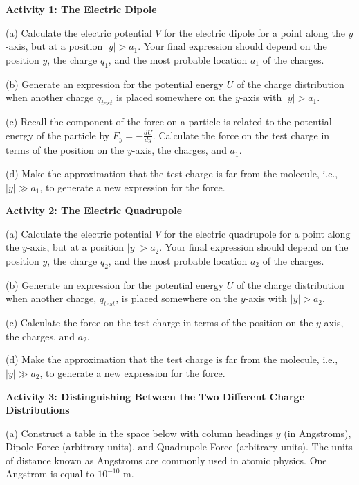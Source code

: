 \textbf{Activity 1: The Electric Dipole }

(a) Calculate the electric potential $V$ for the electric dipole for
a point along the $y$-axis, but at a position $\left| y\right| >
a_1$. Your final expression should depend on the position
$y$, the charge $q_1$, and the most probable location $a_1$ of the
charges.
\answerspace{20mm}

\pagebreak[2]
(b) Generate an expression for the potential energy $U$ of the charge
distribution when another charge $q_{test}$ is placed somewhere
on the $y$-axis with $\left| y\right|  > a_1$.
\answerspace{20mm}

(c) Recall the component of the force on a particle is related to
the potential energy of the particle by $F_y  = - \frac{dU}{dy}$.
Calculate the force on the test charge in terms of the position on
the $y$-axis, the charges, and $a_1$.
\answerspace{20mm}

(d) Make the approximation that the test charge is far from the molecule,
i.e., $\left| y\right|  \gg  a_1$, to generate
a new expression for the force.
\answerspace{20mm}

\textbf{Activity 2: The Electric Quadrupole} 

(a) Calculate the electric potential $V$ for the electric quadrupole
for a point along the $y$-axis, but at a position $\left| y\right|  > a_2$. Your final expression should depend on the position $y$, the charge $q_2$, and the most probable location $a_2$ of the
charges.
\answerspace{20mm}

(b) Generate an expression for the potential energy $U$ of the charge
distribution when another charge, $q_{test}$, is placed somewhere
on the $y$-axis with $\left| y\right|   > a_2$.
\answerspace{20mm}

(c) Calculate the force on the test charge in terms of the position
on the $y$-axis, the charges, and $a_2$.
\answerspace{25mm}

\pagebreak[2]
(d) Make the approximation that the test charge is far from the molecule,
i.e., $\left| y\right|  \gg a_2$, to generate
a new expression for the force.
\answerspace{25mm}

\textbf{Activity 3: Distinguishing Between the Two Different Charge
Distributions} 

(a) Construct a table in the space below with column headings $y$ (in Angstroms),
Dipole Force (arbitrary units), and Quadrupole Force (arbitrary units).
The units of distance known as Angstroms are commonly used in atomic
physics. One Angstrom is equal to $10^{-10}$ m.
\answerspace{25mm}

